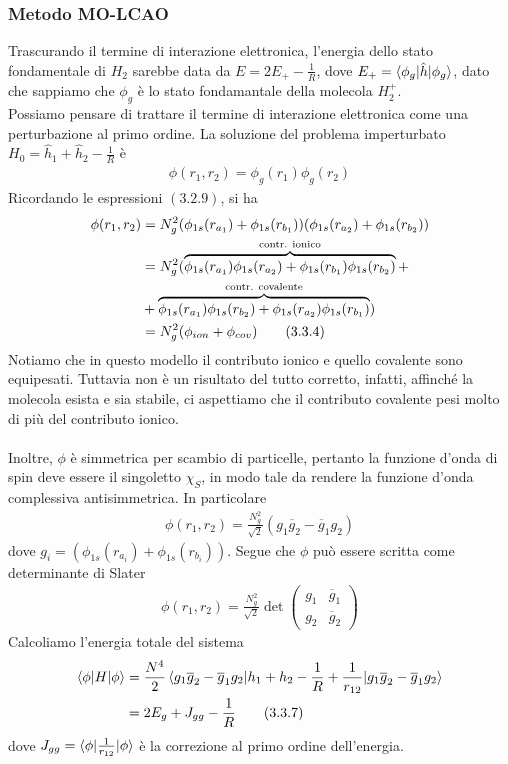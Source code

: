 \documentclass{article}
\begin{document}
\subsubsection*{Metodo MO-LCAO}
Trascurando il termine di interazione elettronica, l'energia dello stato fondamentale di $H_2$ sarebbe data da $E = 2E_+ - \frac{1}{R}$, dove $E_+ = \braket{\phi_g|\hat{h}|\phi_g}$, dato che sappiamo che $\phi_g$ è lo stato fondamantale della molecola $H^+_2$. \\
Possiamo pensare di trattare il termine di interazione elettronica come una perturbazione al primo ordine. La soluzione del problema imperturbato $H_0 = \hat{h}_1 + \hat{h}_2 - \frac{1}{R}$ è
\begin{align}
    \phi(r_1, r_2) = \phi_g(r_1)\phi_g(r_2) \tag{3.3.3}
\end{align}
Ricordando le espressioni $(3.2.9)$, si ha 
\begin{align}
    \phi(r_1, r_2) &= N^2_g(\phi_{1s}(r_{a_1}) + \phi_{1s}(r_{b_1}))(\phi_{1s}(r_{a_2}) + \phi_{1s}(r_{b_2})) \notag \\
    &=N^2_g(\overbrace{\phi_{1s}(r_{a_1})\phi_{1s}(r_{a_2}) + \phi_{1s}(r_{b_1})\phi_{1s}(r_{b_2})}^{\text{contr. ionico}} + \notag \\
    &+ \overbrace{\phi_{1s}(r_{a_1})\phi_{1s}(r_{b_2}) + \phi_{1s}(r_{a_2})\phi_{1s}(r_{b_1})}^{\text{contr. covalente}}) \notag \\
    &= N^2_g(\phi_{ion} + \phi_{cov}) \tag{3.3.4}
\end{align}
Notiamo che in questo modello il contributo ionico e quello covalente sono equipesati. Tuttavia non è un risultato del tutto corretto, infatti, affinché la molecola esista e sia stabile, ci aspettiamo che il contributo covalente pesi molto di più del contributo ionico. \\ \\
Inoltre, $\phi$ è simmetrica per scambio di particelle, pertanto la funzione d'onda di spin deve essere il singoletto $\chi_S$, in modo tale da rendere la funzione d'onda complessiva antisimmetrica. In particolare 
\begin{align}
    \phi(r_1, r_2) = \frac{N^2_g}{\sqrt{2}}(g_1\overline{g}_2 - \overline{g}_1g_2) \tag{3.3.5}
\end{align}
dove $g_i = (\phi_{1s}(r_{a_i}) + \phi_{1s}(r_{b_i}))$. Segue che $\phi$ può essere scritta come determinante di Slater
\begin{align}
    \phi(r_1, r_2) = \frac{N^2_g}{\sqrt{2}}\det\begin{pmatrix}
        g_1 & \overline{g}_1 \\
        g_2 & \overline{g}_2
    \end{pmatrix} \tag{3.3.6}
\end{align}
Calcoliamo l'energia totale del sistema 
\begin{align}
    \braket{\phi|H|\phi} &= \frac{N^4}{2}\braket{g_1\overline{g}_2 - \overline{g}_1g_2|h_1 + h_2 - \frac{1}{R} + \frac{1}{r_{12}}|g_1\overline{g}_2 - \overline{g}_1g_2} \notag \\
    &= 2E_g + J_{gg} - \frac{1}{R} \tag{3.3.7}
\end{align}
dove $J_{gg} = \braket{\phi|\frac{1}{r_{12}}|\phi}$ è la correzione al primo ordine dell'energia.
\end{document}
